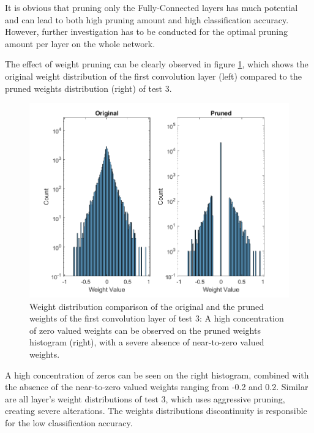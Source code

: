 It is obvious that pruning only the Fully-Connected layers has much potential and can lead to both high pruning amount and high classification accuracy. However, further investigation has to be conducted for the optimal pruning amount per layer on the whole network.

The effect of weight pruning can be clearly observed in figure \ref{fig:weight-distribution-comparison-pruned-conv1-test3}, which shows the original weight distribution of the first convolution layer (left) compared to the pruned weights distribution (right) of test 3.

\begin{figure} [H]
	\centering
	\includegraphics[width=\textwidth]{Images/Weights-distributions/pruned/41.22/weight-distribution-conv1.png}
	\decoRule
	\caption[Weight distribution comparison of the original and the pruned weights of the first convolution layer of test 3]{Weight distribution comparison of the original and the pruned weights of the first convolution layer  of test 3: A high concentration of zero valued weights can be observed on the pruned weights histogram (right), with a severe absence of near-to-zero valued weights.}
	\label{fig:weight-distribution-comparison-pruned-conv1-test3}
\end{figure}

A high concentration of zeros can be seen on the right histogram, combined with the absence of the near-to-zero valued weights ranging from -0.2 and 0.2. Similar are all layer's weight distributions of test 3, which uses aggressive pruning, creating severe alterations. The weights distributions discontinuity is responsible for the low classification accuracy.

